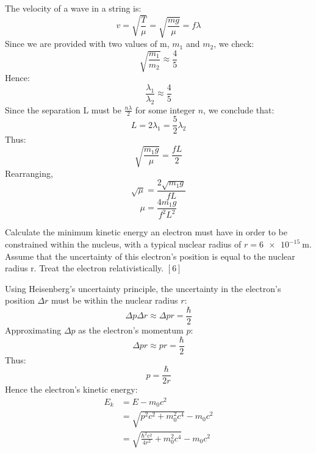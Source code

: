 \begin{solution}
    The velocity of a wave in a string is:
    \[v = \sqrt{\frac{T}{\mu}} = \sqrt{\frac{mg}{\mu}} = f\lambda\]
    Since we are provided with two values of m, \(m_1\) and \(m_2\), we check:
    \[\sqrt{\frac{m_1}{m_2}} \approx \frac{4}{5}\]
    Hence:
    \[\frac{\lambda_1}{\lambda_2} \approx \frac{4}{5}\]
    Since the separation L must be \(\frac{n\lambda}{2}\) for some integer \(n\), we conclude that:
    \[L = 2\lambda_1 = \frac{5}{2}\lambda_2\]
    Thus:
    \[\sqrt{\frac{m_1g}{\mu}} = \frac{fL}{2}\]
    Rearranging,
    \[\sqrt{\mu} = \frac{2\sqrt{m_1g}}{fL}\]
    \[\boxed{\mu = \frac{4m_1g}{f^2L^2}}\]
\end{solution}
\newpage
\begin{problem}
    Calculate the minimum kinetic energy an electron must have in order to be constrained within the nucleus, with a typical nuclear radius of $r = \qty{6e-15}{\m}$. Assume that the uncertainty of this electron’s position is equal to the nuclear radius r. Treat the electron relativistically. \hfill $[6]$
\end{problem}
\begin{solution}
    Using Heisenberg's uncertainty principle, the uncertainty in the electron's position $\Delta r$ must be within the nuclear radius $r$:
    \[\Delta p\Delta r \approx \Delta pr = \frac{\hbar}{2}\]
    Approximating $\Delta p$ as the electron's momentum $p$:
    \[\Delta pr \approx pr = \frac{\hbar}{2}\]
    Thus:
    \[p = \frac{\hbar}{2r}\]
    Hence the electron's kinetic energy:
    \begin{equation}
        \begin{split}
            E_k &= E - m_0c^2 \\
            &= \sqrt{p^2c^2+m_0^2c^4} - m_0c^2 \\
            &= \boxed{\sqrt{\frac{\hbar^2c^2}{4r^2}+m_0^2c^4} - m_0c^2} \\
        \end{split}
    \end{equation}
\end{solution}
\newpage
